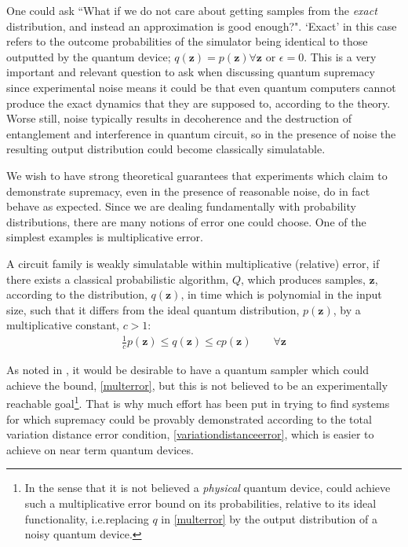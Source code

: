 One could ask ``What if we do not care about getting samples from the \textit{exact} distribution, and instead an approximation is good enough?". `Exact' in this case refers to the outcome probabilities of the simulator being identical to those outputted by the quantum device; $q(\mathbf{z}) = p(\mathbf{z}) \forall \mathbf{z}$ or $\epsilon = 0$. This is a very important and relevant question to ask when discussing quantum supremacy since experimental noise means it could be that even quantum computers cannot produce the exact dynamics that they are supposed to, according to the theory. Worse still, noise typically results in decoherence and the destruction of entanglement and interference in quantum circuit, so in the presence of noise the resulting output distribution could become classically simulatable.

We wish to have strong theoretical guarantees that experiments which claim to demonstrate supremacy, even in the presence of reasonable noise, do in fact behave as expected. Since we are dealing fundamentally with probability distributions, there are many notions of error one could choose. One of the simplest examples is multiplicative error.

\begin{definition}
    \label{defnmulterror}
    A circuit family is weakly simulatable within multiplicative (relative) error, if there exists a classical probabilistic algorithm, $Q$, which produces samples, $\mathbf{z}$, according to the distribution, $q(\mathbf{z})$,  in time which is polynomial in the input size, such that it differs from the ideal quantum distribution, $p(\mathbf{z})$, by a multiplicative constant, $c > 1$:
    \begin{align}
        \frac{1}{c}p(\mathbf{z}) \leq q(\mathbf{z}) \leq c p(\mathbf{z}) \qquad \forall \mathbf{z} \label{multerror}
    \end{align}
\end{definition}

As noted in , it would be desirable to have a quantum sampler which could achieve the bound, \eqref{multerror}, but this is not believed to be an experimentally reachable goal\footnote{In the sense that it is not believed a \textit{physical} quantum device, could achieve such a multiplicative error bound on its probabilities, relative to its ideal functionality, i.e.\@ replacing $q$ in \eqref{multerror} by the output distribution of a noisy quantum device.}. That is why much effort has been put in trying to find systems for which supremacy could be provably demonstrated according to the total variation distance error condition, \eqref{variationdistanceerror}, which is easier to achieve on near term quantum devices. 

